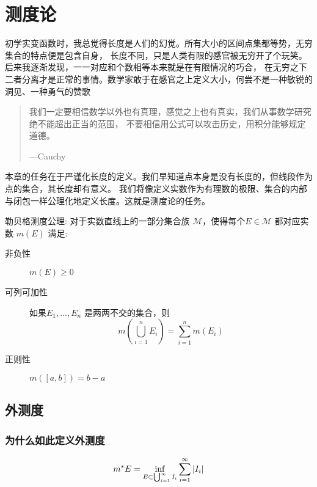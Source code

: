 \chapter{测度论}

初学实变函数时，我总觉得长度是人们的幻觉。所有大小的区间点集都等势，无穷集合的特点便是包含自身，
长度不同，只是人类有限的感官被无穷开了个玩笑。后来我逐渐发现，一一对应和个数相等本来就是在有限情况的巧合，
在无穷之下二者分离才是正常的事情。数学家敢于在感官之上定义大小，何尝不是一种敏锐的洞见、一种勇气的赞歌

\begin{quote}
    我们一定要相信数学以外也有真理，感觉之上也有真实，我们从事数学研究绝不能超出正当的范围，
    不要相信用公式可以攻击历史，用积分能够规定道德。

    \hfill ---Cauchy
\end{quote}

本章的任务在于严谨化长度的定义。我们早知道点本身是没有长度的，但线段作为点的集合，其长度却有意义。
我们将像定义实数作为有理数的极限、集合的内部与闭包一样公理化地定义长度。这就是测度论的任务。

\begin{definition}
    勒贝格测度公理: 对于实数直线上的一部分集合族 \(\mathscr{M}\)，使得每个\(E \in
    \mathscr{M}\) 都对应实数 \(m(E)\) 满足:
    \begin{description}
        \item[非负性] \(m(E) \geq 0\)
        \item[可列可加性] 如果\(E_1, \dots ,E_{n}\) 是两两不交的集合，则
            \[
                m\left(\bigcup_{i=1}^{n} E_i\right) =
                \sum_{i=1}^{n} m(E_i)
            \]
        \item[正则性] \(m([a,b])=b-a\)
    \end{description}
\end{definition}

\section{外测度}
\subsection{为什么如此定义外测度}

\begin{definition}
    \[
        m^{*} E=\inf_{E\subset \bigcup_{i=1}^{\infty} I_{i}}
        \sum_{i=1}^{\infty} \left|I_{i}\right|
    \]
\end{definition}

